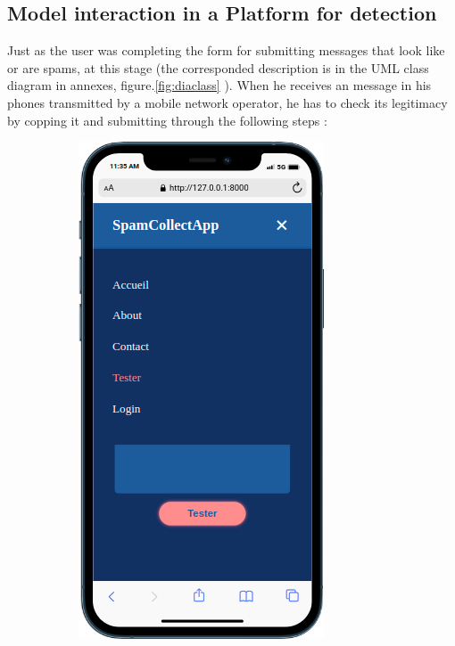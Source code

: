 \documentclass[12pt,a4paper, oneside]{book}
\begin{document}
\subsection{Model interaction in a Platform for detection}
Just as the user was completing the form for submitting messages that look like or are spams, at  this stage (the corresponded description is in the UML class diagram in annexes, figure.\ref{fig:diaclass} ). When he receives an message in his phones transmitted by a mobile network operator, he has to check its legitimacy by copping it and submitting through the following steps :
\begin{figure}[h]
	\centering
	\begin{subfigure}{3.5cm}
		\centering
		\includegraphics[width=1\linewidth]{CollectImages/mobileSpamTest.png}

\end{subfigure}
\end{figure}
\end{document}
